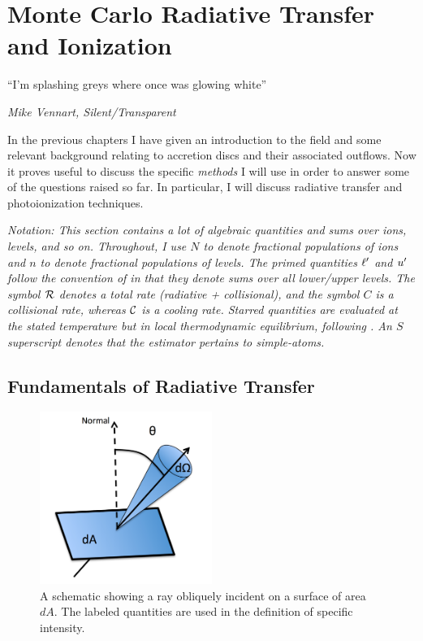 \chapter{Monte Carlo Radiative Transfer and Ionization}

\epigraph{``I'm splashing greys where once was glowing white''}{{\sl Mike Vennart, Silent/Transparent}}

In the previous chapters I have given an introduction to the field and 
some relevant background relating to accretion 
discs and their associated outflows. Now it proves useful
to discuss the specific {\em methods} I will use
in order to answer some of the questions raised so far.
In particular, I will discuss radiative transfer and photoionization
techniques.

{\sl Notation: This section contains a lot of algebraic quantities and sums over
ions, levels, and so on. Throughout, I use $N$ to denote fractional
populations of ions and $n$ to denote fractional populations of levels. 
The primed quantities ${\ell^\prime}$ and ${u^\prime}$ follow the convention of 
\cite{lucy2002} in that they denote sums over all lower/upper levels.
The symbol ${\cal R}$ denotes a total rate (radiative + collisional), 
and the symbol $C$ is a collisional rate, whereas ${\cal C}$ is a cooling 
rate. Starred quantities are evaluated at the stated temperature but 
in local thermodynamic equilibrium, following \cite{mihalas}. An $S$ 
superscript denotes that the estimator pertains to simple-atoms.
}



\section{Fundamentals of Radiative Transfer}

\begin{figure}
\centering
\includegraphics[width=0.5\textwidth]{figures/03-radtrans/rays_schematic.png}
\caption
{
A schematic showing a ray obliquely incident on a surface of area $dA$.
The labeled quantities are used in the definition of specific intensity.
} 
\label{fig:ray}
\end{figure}

